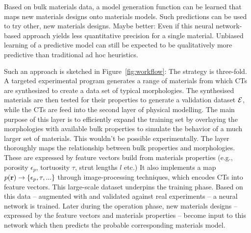 Based on bulk materials data, a model generation function can be learned that maps new materials designs onto materials models. Such predictions can be used to try other, new materials designs. Maybe better: Even if this neural network-based approach yields less quantitative precision for a single material. Unbiased learning of a predictive model can still be expected to be qualitatively more predictive than traditional ad hoc heuristics.

Such an approach is sketched in Figure~\ref{fig:workflow}: 
The strategy is three-fold. A targeted experimental program generates a range of materials from which CTs are synthesized to create a data set of typical morphologies. The synthesised materials are then tested for their properties to generate a validation dataset ${\cal E}$, while the CTs are feed into the second layer of physical modelling. The main purpose of this layer is to efficiently expand the training set by overlaying the morphologies with available bulk properties to simulate the behavior of a much larger set of materials. This wouldn't be possible experimentally. The layer thoroughly maps the relationship between bulk properties and morphologies. These are expressed by feature vectors build from materials properties (e.g., porosity $\epsilon_p$, tortuosity $\tau$, strut lengths $l$ etc.)  It also implements a map $p({\bf r})\rightarrow \left\{\epsilon_p,\tau,...\right\}$ through image-processing techniques, which encodes CTs into feature vectors. This large-scale dataset underpins the training phase. Based on this data -- augmented with and validated against real experiments -- a neural network is trained. Later during the operation phase, new materials designs -- expressed by the feature vectors and materials properties -- become input to this network which then predicts the probable corresponding materials model. 

